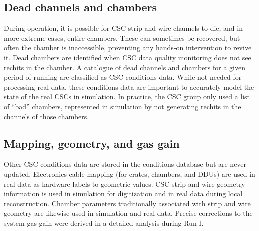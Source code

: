 \subsection{Dead channels and chambers}

During operation, it is possible for CSC strip and wire channels to die, and in more extreme cases, entire chambers. These can sometimes be recovered, but often the chamber is inaccessible, preventing any hands-on intervention to revive it. Dead chambers are identified when CSC data quality monitoring does not see rechits in the chamber. A catalogue of dead channels and chambers for a given period of running are classified as CSC conditions data. While not needed for processing real data, these conditions data are important to accurately model the state of the real CSCs in simulation. In practice, the CSC group only used a list of ``bad'' chambers, represented in simulation by not generating rechits in the channels of those chambers.

\subsection{Mapping, geometry, and gas gain}

Other CSC conditions data are stored in the conditions database but are never updated. Electronics cable mapping (for crates, chambers, and DDUs) are used in real data as hardware labels to geometric values. CSC strip and wire geometry information is used in simulation for digitization and in real data during local reconstruction. Chamber parameters traditionally associated with strip and wire geometry are likewise used in simulation and real data. Precise corrections to the system gas gain were derived in a detailed analysis during Run I.
  